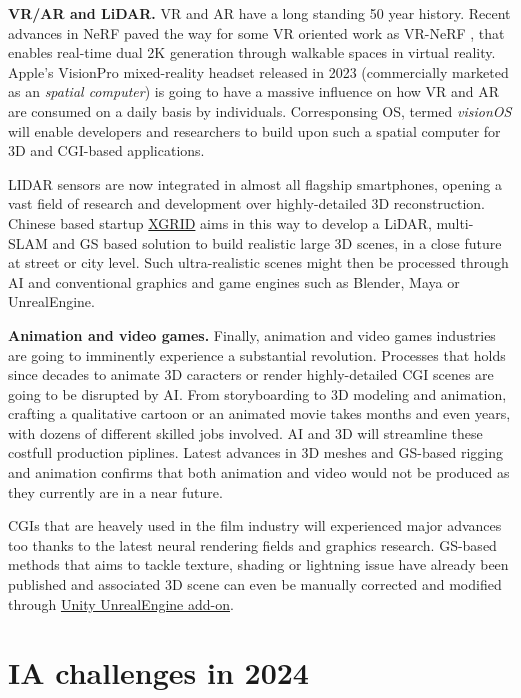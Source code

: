 \noindent \textbf{VR/AR and LiDAR.} \ac{VR} and \ac{AR} have a long standing 50 year history. Recent advances in \ac{NeRF} paved the way for some VR oriented work as VR-NeRF \citep{xu2023vr}, that enables real-time dual 2K generation through walkable spaces in virtual reality. Apple's VisionPro mixed-reality headset released in 2023 (commercially marketed as an \textit{spatial computer}) is going to have a massive influence on how \ac{VR} and \ac{AR} are consumed on a daily basis by individuals. Corresponsing OS, termed \textit{visionOS} will enable developers and researchers to build upon such a {spatial computer} for 3D and \ac{CGI}-based applications.

LIDAR sensors are now integrated in almost all flagship smartphones, opening a vast field of research and development over highly-detailed 3D reconstruction. Chinese based startup \href{https://www.xgrids.com/}{XGRID} aims in this way to develop a LiDAR, multi-SLAM and \ac{GS} based solution to build realistic large 3D scenes, in a close future at street or city level. Such ultra-realistic scenes might then be processed through \ac{AI} and conventional graphics and game engines such as Blender, Maya or UnrealEngine. 

\noindent \textbf{Animation and video games.} Finally, animation and video games industries are going to imminently experience a substantial revolution. Processes that holds since decades to animate 3D caracters or render highly-detailed \ac{CGI} scenes are going to be disrupted by \ac{AI}. From storyboarding to 3D modeling and animation, crafting a qualitative cartoon or an animated movie takes months and even years, with dozens of different skilled jobs involved. \ac{AI} and 3D will streamline these costfull production piplines. Latest advances in 3D meshes and \ac{GS}-based rigging and animation \citep{qian2023gaussianavatars,li2024animatablegaussians} confirms that both animation and video would not be produced as they currently are in a near future. 

\ac{CGI}s that are heavely used in the film industry will experienced major advances too thanks to the latest neural rendering fields and graphics research. \ac{GS}-based methods that aims to tackle texture, shading or lightning issue have already been published \citep{jiang2023gaussianshader,wu2024deferredgs} and associated 3D scene can even be manually corrected and modified through \href{https://github.com/aras-p/UnityGaussianSplatting/}{Unity UnrealEngine add-on}. 


\section{IA challenges in 2024}

